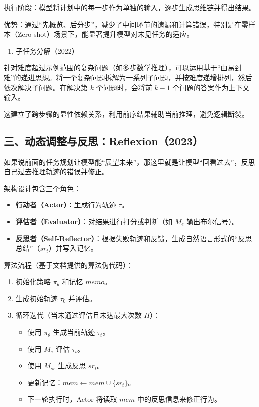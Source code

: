 执行阶段：模型将计划中的每一步作为单独的输入，逐步生成思维链并得出结果。

优势：通过``先概览、后分步''，减少了中间环节的遗漏和计算错误，特别是在零样本（Zero-shot）场景下，能显著提升模型对未见任务的适应。

\begin{enumerate}
\def\labelenumi{\arabic{enumi}.}
\setcounter{enumi}{1}
\tightlist
\item
  子任务分解（2022）
\end{enumerate}

针对难度超过示例范围的复杂问题（如多步数学推理），可以运用基于``由易到难''的递进思想。将一个复杂问题拆解为一系列子问题，并按难度递增排列，然后依次解决子问题。在解决第 \(k\) 个问题时，会将前 \(k-1\) 个问题的答案作为上下文输入。

这建立了跨步骤的显性依赖关系，利用前序结果辅助当前推理，避免逻辑断裂。

\hypertarget{ux4e09ux52a8ux6001ux8c03ux6574ux4e0eux53cdux601dreflexion2023}{%
\subsection{三、动态调整与反思：Reflexion（2023）}\label{ux4e09ux52a8ux6001ux8c03ux6574ux4e0eux53cdux601dreflexion2023}}

如果说前面的任务规划让模型能``展望未来''，那这里就是让模型``回看过去''，反思自己过去推理轨迹的错误并修正。

架构设计包含三个角色：

\begin{itemize}
\tightlist
\item
  \textbf{行动者（Actor）}：生成行为轨迹 \(\tau\)。
\item
  \textbf{评估者（Evaluator）}：对结果进行打分或判断（如 \(M_e\) 输出布尔信号）。
\item
  \textbf{反思者（Self-Reflector）}：根据失败轨迹和反馈，生成自然语言形式的``反思总结''（\(sr_t\)）并写入记忆。
\end{itemize}

算法流程（基于文档提供的算法伪代码）：

\begin{enumerate}
\def\labelenumi{\arabic{enumi}.}
\tightlist
\item
  初始化策略 \(\pi_\theta\) 和记忆 \(memo\)。
\item
  生成初始轨迹 \(\tau_0\) 并评估。
\item
  循环迭代（当未通过评估且未达最大次数 \(H\)）：

  \begin{itemize}
  \tightlist
  \item
    使用 \(\pi_\theta\) 生成当前轨迹 \(\tau_t\)。
  \item
    使用 \(M_e\) 评估 \(\tau_t\)。
  \item
    使用 \(M_{sr}\) 生成反思 \(sr_t\)。
  \item
    更新记忆：\(mem \leftarrow mem \cup \{sr_t\}\)。
  \item
    下一轮执行时，Actor 将读取 \(mem\) 中的反思信息来修正行为。
  \end{itemize}
\end{enumerate}

